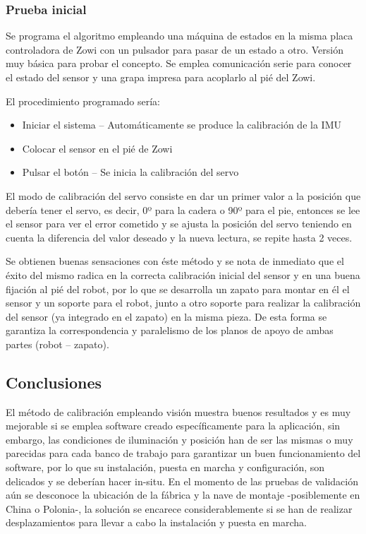 \subsubsection{Prueba inicial}

Se programa el algoritmo empleando una máquina de estados en la misma placa controladora de Zowi con un pulsador para pasar de un estado a otro. Versión muy básica para probar el concepto. Se emplea comunicación serie para conocer el estado del sensor y una grapa impresa para acoplarlo al pié del Zowi.

El procedimiento programado sería:
\begin{itemize}
  \item Iniciar el sistema -- Automáticamente se produce la calibración de la IMU
  \item Colocar el sensor en el pié de Zowi
  \item Pulsar el botón -- Se inicia la calibración del servo
\end{itemize}

El modo de calibración del servo consiste en dar un primer valor a la posición que debería tener el servo, es decir, 0º para la cadera o 90º para el pie, entonces se lee el sensor para ver el error cometido y se ajusta la posición del servo teniendo en cuenta la diferencia del valor deseado y la nueva lectura, se repite hasta 2 veces.

Se obtienen buenas sensaciones con éste método y se nota de inmediato que el éxito del mismo radica en la correcta calibración inicial del sensor y en una buena fijación al pié del robot, por lo que se desarrolla un zapato para montar en él el sensor y un soporte para el robot, junto a otro soporte para realizar la calibración del sensor (ya integrado en el zapato) en la misma pieza. De esta forma se garantiza la correspondencia y paralelismo de los planos de apoyo de ambas partes (robot – zapato).


\subsection{Conclusiones}
El método de calibración empleando visión muestra buenos resultados y es muy mejorable si se emplea software creado específicamente para la aplicación, sin embargo, las condiciones de iluminación y posición han de ser las mismas o muy parecidas para cada banco de trabajo para garantizar un buen funcionamiento del software, por lo que su instalación, puesta en marcha y configuración, son delicados y se deberían hacer in-situ. En el momento de las pruebas de validación aún se desconoce la ubicación de la fábrica y la nave de montaje -posiblemente en China o Polonia-,  la solución se encarece considerablemente si se han de realizar desplazamientos para llevar a cabo la instalación y puesta en marcha.

